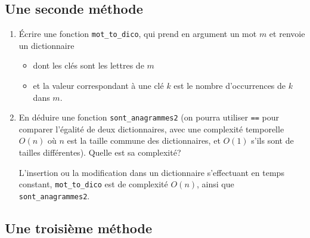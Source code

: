 \documentclass[10pt]{article}
\begin{document}
\subsection*{Une seconde méthode}

\begin{enumerate}[resume]
\item Écrire une fonction \verb+mot_to_dico+, qui prend en argument un mot $m$ et renvoie un dictionnaire
  \begin{itemize}
  \item dont les clés sont les lettres de $m$
  \item et la valeur correspondant à une clé $k$ est le nombre d'occurrences de $k$ dans $m$. 
  \end{itemize}
\item En déduire une fonction \verb+sont_anagrammes2+ (on pourra
  utiliser \verb+==+ pour comparer l'égalité de deux dictionnaires,
  avec une complexité temporelle $O(n)$ où $n$ est la taille commune
  des dictionnaires, et $O(1)$ s'ils sont de tailles différentes). Quelle est sa complexité?

  \begin{correction}
    L'insertion ou la modification dans un dictionnaire s'effectuant
    en temps constant, \verb+mot_to_dico+ est de complexité $O(n)$,
    ainsi que \verb+sont_anagrammes2+.
  \end{correction}
  
\end{enumerate}

\subsection*{Une troisième méthode}
\end{document}
